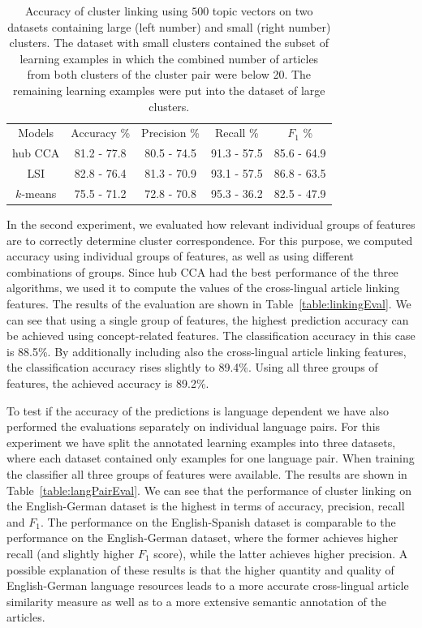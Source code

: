 \begin{table}[t]
\caption[Accuracy of cluster linking: large vs small clusters]{Accuracy of cluster linking using $500$ topic vectors on two datasets containing large (left number)
and small (right number) clusters. The dataset with small clusters contained the subset of
learning examples in which the combined number of articles from both clusters of the cluster
pair were below 20. The remaining learning examples were put into the dataset of large clusters.}
\begin{center}
\begin{tabular}{|c|c|c|c|c|}
  \hline
  \cline{1-5}
  Models & Accuracy \% & Precision \% & Recall \% & $F_1$ \% \\ \cline{1-5}
  hub CCA  & 81.2 - 77.8 & 80.5 - 74.5 & 91.3 - 57.5 & 85.6 - 64.9 \\ \cline{1-5}
  LSI      & 82.8 - 76.4 & 81.3 - 70.9 & 93.1 - 57.5 & 86.8 - 63.5 \\ \cline{1-5}
 $k$-means & 75.5 - 71.2 & 72.8 - 70.8 & 95.3 - 36.2 & 82.5 - 47.9 \\ \cline{1-5}
\end{tabular}
\end{center}
\label{table:linkingEvalAlgosLargeSmall}
\end{table}

In the second experiment, we evaluated how relevant individual groups of features are
to correctly determine cluster correspondence. For this purpose, we computed accuracy using
individual groups of features, as well as using different combinations of groups.
Since hub CCA had the best performance of the three algorithms, we used it to compute
the values of the cross-lingual article linking features. The results of the evaluation
are shown in Table~\ref{table:linkingEval}. We can see that using a single group of features,
the highest prediction accuracy can be achieved using concept-related features.
The classification accuracy in this case is 88.5\%. By additionally including also the
cross-lingual article linking features, the classification accuracy rises slightly
to 89.4\%. Using all three groups of features, the achieved accuracy is 89.2\%.

To test if the accuracy of the predictions is language dependent we have also
performed the evaluations separately on individual language pairs. For this
experiment we have split the annotated learning examples into three datasets,
where each dataset contained only examples for one language pair. When
training the classifier all three groups of features were available. The
results are shown in Table~\ref{table:langPairEval}. We can see that the
performance of cluster linking on the English-German dataset is the highest
in terms of accuracy, precision, recall and $F_1$. The performance on the
English-Spanish dataset is comparable to the performance on the English-German
dataset, where the former achieves higher recall (and slightly higher $F_1$ score),
while the latter achieves higher precision. A possible explanation of these
results is that the higher quantity and quality of English-German language
resources leads to a more accurate cross-lingual article similarity measure
as well as to a more extensive semantic annotation of the articles.

